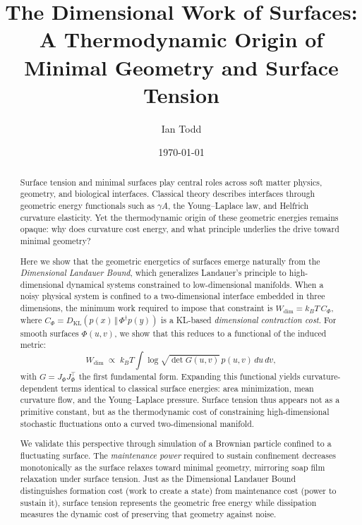 \documentclass[aps,pre,twocolumn,superscriptaddress,floatfix]{revtex4-2}
\begin{document}
\title{The Dimensional Work of Surfaces: A Thermodynamic Origin of Minimal Geometry and Surface Tension}

\author{Ian Todd}

\date{\today}

\begin{abstract}
Surface tension and minimal surfaces play central roles across soft matter physics, geometry, and biological interfaces. Classical theory describes interfaces through geometric energy functionals such as $\gamma A$, the Young--Laplace law, and Helfrich curvature elasticity. Yet the thermodynamic origin of these geometric energies remains opaque: why does curvature cost energy, and what principle underlies the drive toward minimal geometry?

Here we show that the geometric energetics of surfaces emerge naturally from the \emph{Dimensional Landauer Bound}, which generalizes Landauer's principle to high-dimensional dynamical systems constrained to low-dimensional manifolds. When a noisy physical system is confined to a two-dimensional interface embedded in three dimensions, the minimum work required to impose that constraint is $W_{\mathrm{dim}} = k_B T \, C_\Phi$, where $C_\Phi = D_{\mathrm{KL}}(p(x)\,\Vert\,\Phi^\dagger p(y))$ is a KL-based \emph{dimensional contraction cost}. For smooth surfaces $\Phi(u,v)$, we show that this reduces to a functional of the induced metric:
\[
W_{\mathrm{dim}} \;\propto\; k_B T \int \log\sqrt{\det G(u,v)} \, p(u,v)\,du\,dv,
\]
with $G = J_\Phi J_\Phi^\top$ the first fundamental form. Expanding this functional yields curvature-dependent terms identical to classical surface energies: area minimization, mean curvature flow, and the Young--Laplace pressure. Surface tension thus appears not as a primitive constant, but as the thermodynamic cost of constraining high-dimensional stochastic fluctuations onto a curved two-dimensional manifold.

We validate this perspective through simulation of a Brownian particle confined to a fluctuating surface. The \emph{maintenance power} required to sustain confinement decreases monotonically as the surface relaxes toward minimal geometry, mirroring soap film relaxation under surface tension. Just as the Dimensional Landauer Bound distinguishes formation cost (work to create a state) from maintenance cost (power to sustain it), surface tension represents the geometric free energy while dissipation measures the dynamic cost of preserving that geometry against noise.
\end{abstract}
\end{document}
